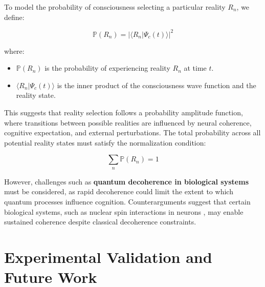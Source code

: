 \documentclass{article}
\begin{document}
To model the probability of consciousness selecting a particular reality $R_n$, we define:

\begin{equation}
    \mathbb{P}(R_n) = |\langle R_n | \Psi_c(t) \rangle|^2
\end{equation}

where:
\begin{itemize}
    \item $\mathbb{P}(R_n)$ is the probability of experiencing reality $R_n$ at time $t$.
    \item $\langle R_n | \Psi_c(t) \rangle$ is the inner product of the consciousness wave function and the reality state.
\end{itemize}

This suggests that reality selection follows a probability amplitude function, where transitions between possible realities are influenced by neural coherence, cognitive expectation, and external perturbations. The total probability across all potential reality states must satisfy the normalization condition:

\begin{equation}
    \sum_{n} \mathbb{P}(R_n) = 1
\end{equation}

However, challenges such as \textbf{quantum decoherence in biological systems} \cite{tegmark2015consciousness} must be considered, as rapid decoherence could limit the extent to which quantum processes influence cognition. Counterarguments suggest that certain biological systems, such as nuclear spin interactions in neurons \cite{fisher2015quantum}, may enable sustained coherence despite classical decoherence constraints.

\section{Experimental Validation and Future Work}
\end{document}
